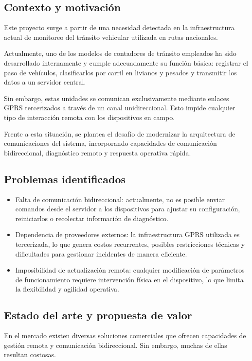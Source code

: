 \documentclass[
11pt, %
]{charter}
\begin{document}
\subsection{Contexto y motivación}
Este proyecto surge a partir de una necesidad detectada en la infraestructura actual de monitoreo del tránsito vehicular utilizada en rutas nacionales.

Actualmente, uno de los modelos de contadores de tránsito empleados ha sido desarrollado internamente y cumple adecuadamente su función básica: registrar el paso de vehículos, clasificarlos por carril en livianos y pesados y transmitir los datos a un servidor central.

Sin embargo, estas unidades se comunican exclusivamente mediante enlaces GPRS tercerizados a través de un canal unidireccional. Esto impide cualquier tipo de interacción remota con los dispositivos en campo.

Frente a esta situación, se plantea el desafío de modernizar la arquitectura de comunicaciones del sistema, incorporando capacidades de comunicación bidireccional, diagnóstico remoto y respuesta operativa rápida.

\subsection{Problemas identificados}

\begin{itemize}

\item Falta de comunicación bidireccional: actualmente, no es posible enviar comandos desde el servidor a los dispositivos para ajustar su configuración, reiniciarlos o recolectar información de diagnóstico.

\item Dependencia de proveedores externos: la infraestructura GPRS utilizada es tercerizada, lo que genera costos recurrentes, posibles restricciones técnicas y dificultades para gestionar incidentes de manera eficiente.

\item Imposibilidad de actualización remota: cualquier modificación de parámetros de funcionamiento requiere intervención física en el dispositivo, lo que limita la flexibilidad y agilidad operativa.

\end{itemize}

\subsection{Estado del arte y propuesta de valor}
En el mercado existen diversas soluciones comerciales que ofrecen capacidades de gestión remota y comunicación bidireccional. Sin embargo, muchas de ellas resultan costosas.
\end{document}
